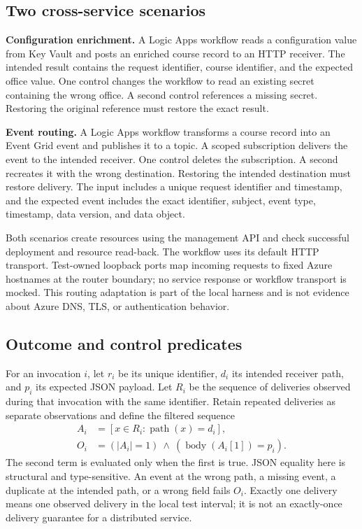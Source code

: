 \documentclass[10pt,a4paper]{article}
\begin{document}
\subsection{Two cross-service scenarios}
\textbf{Configuration enrichment.} A Logic Apps workflow reads a configuration value from Key Vault and posts an enriched course record to an HTTP receiver. The intended result contains the request identifier, course identifier, and the expected office value. One control changes the workflow to read an existing secret containing the wrong office. A second control references a missing secret. Restoring the original reference must restore the exact result.

\textbf{Event routing.} A Logic Apps workflow transforms a course record into an Event Grid event and publishes it to a topic. A scoped subscription delivers the event to the intended receiver. One control deletes the subscription. A second recreates it with the wrong destination. Restoring the intended destination must restore delivery. The input includes a unique request identifier and timestamp, and the expected event includes the exact identifier, subject, event type, timestamp, data version, and data object.

Both scenarios create resources using the management API and check successful deployment and resource read-back. The workflow uses its default HTTP transport. Test-owned loopback ports map incoming requests to fixed Azure hostnames at the router boundary; no service response or workflow transport is mocked. This routing adaptation is part of the local harness and is not evidence about Azure DNS, TLS, or authentication behavior.

\subsection{Outcome and control predicates}
For an invocation $i$, let $r_i$ be its unique identifier, $d_i$ its intended receiver path, and $p_i$ its expected JSON payload. Let $R_i$ be the sequence of deliveries observed during that invocation with the same identifier. Retain repeated deliveries as separate observations and define the filtered sequence
\begin{align}
A_i &= [x\in R_i : \operatorname{path}(x)=d_i],\\
O_i &= (|A_i|=1)\ \land\ (\operatorname{body}(A_i[1])=p_i).
\end{align}
The second term is evaluated only when the first is true. JSON equality here is structural and type-sensitive. An event at the wrong path, a missing event, a duplicate at the intended path, or a wrong field fails $O_i$. Exactly one delivery means one observed delivery in the local test interval; it is not an exactly-once delivery guarantee for a distributed service.
\end{document}
